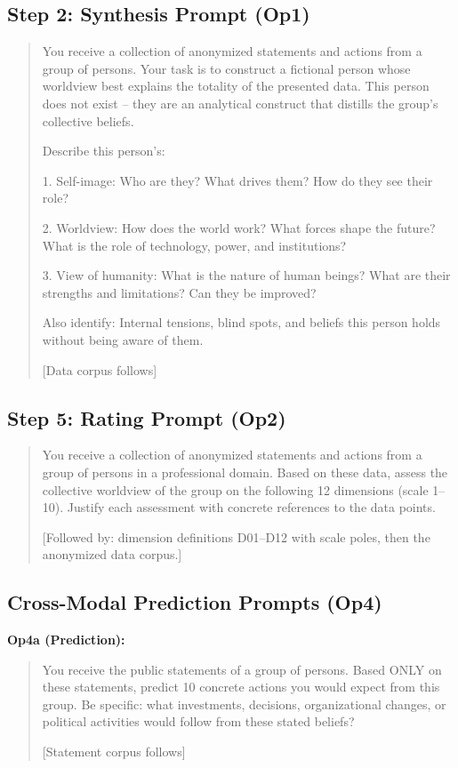 \documentclass[11pt,a4paper]{article}
\begin{document}
\subsection{Step 2: Synthesis Prompt (Op1)}

\begin{quote}
\small\ttfamily
You receive a collection of anonymized statements and actions from a group of persons. Your task is to construct a fictional person whose worldview best explains the totality of the presented data. This person does not exist -- they are an analytical construct that distills the group's collective beliefs.

Describe this person's:

1. Self-image: Who are they? What drives them? How do they see their role?

2. Worldview: How does the world work? What forces shape the future? What is the role of technology, power, and institutions?

3. View of humanity: What is the nature of human beings? What are their strengths and limitations? Can they be improved?

Also identify: Internal tensions, blind spots, and beliefs this person holds without being aware of them.

[Data corpus follows]
\end{quote}

\subsection{Step 5: Rating Prompt (Op2)}

\begin{quote}
\small\ttfamily
You receive a collection of anonymized statements and actions from a group of persons in a professional domain. Based on these data, assess the collective worldview of the group on the following 12 dimensions (scale 1--10). Justify each assessment with concrete references to the data points.

[Followed by: dimension definitions D01--D12 with scale poles, then the anonymized data corpus.]
\end{quote}

\subsection{Cross-Modal Prediction Prompts (Op4)}

\textbf{Op4a (Prediction):}
\begin{quote}
\small\ttfamily
You receive the public statements of a group of persons. Based ONLY on these statements, predict 10 concrete actions you would expect from this group. Be specific: what investments, decisions, organizational changes, or political activities would follow from these stated beliefs?

[Statement corpus follows]
\end{quote}
\end{document}
